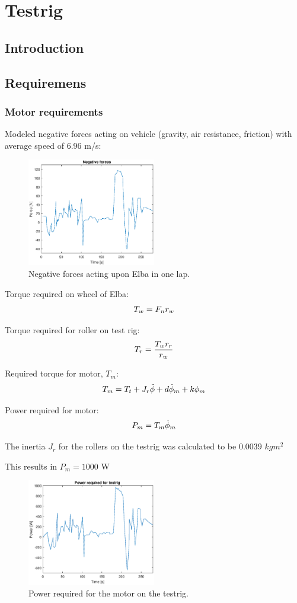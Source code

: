 \chapter{Testrig}
\section{Introduction}

\section{Requiremens}

\subsection{Motor requirements}
Modeled negative forces acting on vehicle (gravity, air resistance, friction) with average speed of 6.96 m/s: 

\begin{figure}[H]
    \centering
    \label{fig:testrig_negative_forces}
    \includegraphics[width=0.5\textwidth]{./testrig/negative_forces.eps}
    \caption{Negative forces acting upon Elba in one lap.}
\end{figure}

Torque required on wheel of Elba:
$$T_w = F_n\*r_w$$

Torque required for roller on test rig:
$$T_r = \frac{T_w\*r_r}{r_w}$$

Required torque for motor, $T_m$:
$$T_m = T_t + J_r\*\ddot{\phi} + d\*\dot{\phi}_m + k\*\phi_m$$

Power required for motor:
$$P_m = T_m\*\dot{\phi}_m$$

The inertia $J_r$ for the rollers on the testrig was calculated to be $0.0039$ $kgm^2$

This results in $P_m = 1000$ W

\begin{figure}[H]
    \centering
    \label{fig:testrig_power_required_motor}
    \includegraphics[width=0.5\textwidth]{./testrig/power_required_testrig.eps}
    \caption{Power required for the motor on the testrig.}
\end{figure}
